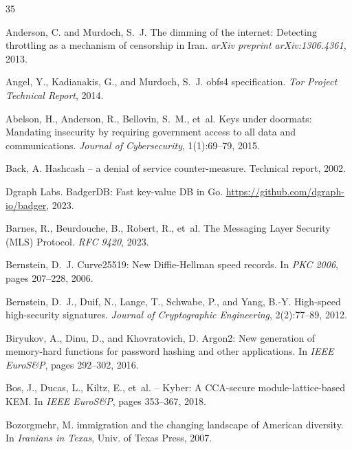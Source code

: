 \documentclass[11pt,a4paper]{article}
\begin{document}
\begin{thebibliography}{35}

Anderson, C. and Murdoch, S.~J.
\newblock The dimming of the internet: Detecting throttling as a mechanism of censorship in {Iran}.
\newblock \emph{arXiv preprint arXiv:1306.4361}, 2013.

Angel, Y., Kadianakis, G., and Murdoch, S.~J.
\newblock obfs4 specification.
\newblock \emph{Tor Project Technical Report}, 2014.

Abelson, H., Anderson, R., Bellovin, S.~M., et~al.
\newblock Keys under doormats: Mandating insecurity by requiring government access to all data and communications.
\newblock \emph{Journal of Cybersecurity}, 1(1):69--79, 2015.

Back, A.
\newblock Hashcash -- a denial of service counter-measure.
\newblock Technical report, 2002.

Dgraph Labs.
\newblock BadgerDB: Fast key-value {DB} in {Go}.
\newblock \url{https://github.com/dgraph-io/badger}, 2023.

Barnes, R., Beurdouche, B., Robert, R., et~al.
\newblock The {Messaging Layer Security (MLS)} Protocol.
\newblock \emph{RFC 9420}, 2023.

Bernstein, D.~J.
\newblock Curve25519: New {Diffie-Hellman} speed records.
\newblock In \emph{PKC 2006}, pages 207--228, 2006.

Bernstein, D.~J., Duif, N., Lange, T., Schwabe, P., and Yang, B.-Y.
\newblock High-speed high-security signatures.
\newblock \emph{Journal of Cryptographic Engineering}, 2(2):77--89, 2012.

Biryukov, A., Dinu, D., and Khovratovich, D.
\newblock Argon2: New generation of memory-hard functions for password hashing and other applications.
\newblock In \emph{IEEE EuroS\&P}, pages 292--302, 2016.

Bos, J., Ducas, L., Kiltz, E., et~al.
 -- {Kyber}: A {CCA}-secure module-lattice-based {KEM}.
\newblock In \emph{IEEE EuroS\&P}, pages 353--367, 2018.

Bozorgmehr, M.
 immigration and the changing landscape of {American} diversity.
\newblock In \emph{Iranians in Texas}, Univ. of Texas Press, 2007.


\end{thebibliography}
\end{document}
